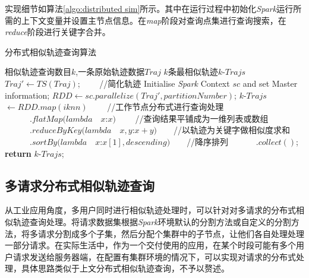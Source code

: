 实现细节如算法\ref{algo:distributed sim}所示。其中在运行过程中初始化\emph{Spark}运行所需的上下文变量并设置主节点信息。在\emph{map}阶段对查询点集进行查询搜索，在\emph{reduce}阶段进行关键字合并。

\begin{algorithm}
\caption{分布式相似轨迹查询算法}
\label{algo:distributed sim}
\begin{algorithmic}[1] %
\Require 相似轨迹查询数目$k$,一条原始轨迹数据$Traj$%
\Ensure $k$条最相似轨迹$k$-$Trajs$ %
\State $Traj' \gets TS(Traj)$; $\qquad$//简化轨迹
\State Initialise \emph{Spark} Context $sc$ and set Master information;
\State $RDD \gets sc.parallelize(Traj', partitionNumber)$;
\State $k$-$Trajs$ $\gets RDD.map(iknn) $ $\qquad$//工作节点分布式进行查询处理
\State $\qquad\quad.flatMap(lambda\quad x$:$x)$ $\qquad$//查询结果平铺成为一维列表或数组
\State $\qquad\quad.reduceByKey(lambda\quad x,y$:$x+y)$$\qquad$//以轨迹为关键字做相似度求和
\State $\quad\qquad.sortBy(lambda\quad x$:$x[1], descending)$$\qquad$//降序排列
\State $\quad\qquad.collect()$;
\State \textbf{return} $k$-$Trajs$; 
\end{algorithmic}
\end{algorithm}

\subsection{多请求分布式相似轨迹查询}
\label{subsec:distributed multiple}
从工业应用角度，多用户同时进行相似轨迹处理时，可以针对对多请求的分布式相似轨迹查询处理。将请求数据集根据\emph{Spark}环境默认的分割方法或自定义的分割方法，将多请求分割成多个子集，然后分配个集群中的子节点，让他们各自处理处理一部分请求。在实际生活中，作为一个交付使用的应用，在某个时段可能有多个用户请求发送给服务器端，在配置有集群环境的情况下，可以实现对请求的分布式处理，具体思路类似于上文分布式相似轨迹查询，不予以赘述。






